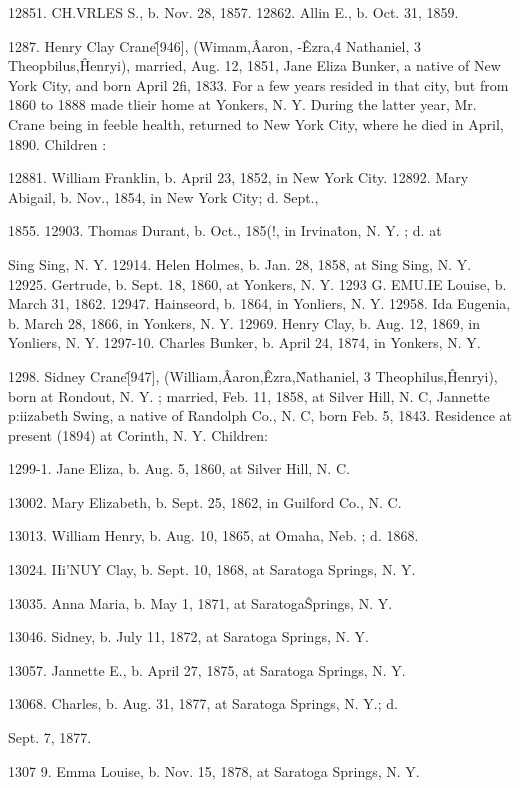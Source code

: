 \documentclass{book}
\begin{document}
12851. CH.VRLES S., b. Nov. 28, 1857. 
12862. Allin E., b. Oct. 31, 1859. 




1287. Henry Clay Crane\^ [946], (Wimam,\^ Aaron, -\^ Ezra,4 
Nathaniel, 3 Theopbilus,\^ Henryi), married, Aug. 12, 1851, Jane 
Eliza Bunker, a native of New York City, and born April 2fi, 
1833. For a few years resided in that city, but from 1860 to 
1888 made tlieir home at Yonkers, N. Y. During the latter year, 
Mr. Crane being in feeble health, returned to New York City, 
where he died in April, 1890. Children : 

12881. William Franklin, b. April 23, 1852, in New York City. 
12892. Mary Abigail, b. Nov., 1854, in New York City; d. Sept., 

1855. 
12903. Thomas Durant, b. Oct., 185(!, in Irvina\^ton, N. Y. ; d. at 

Sing Sing, N. Y. 
12914. Helen Holmes, b. Jan. 28, 1858, at Sing Sing, N. Y. 
12925. Gertrude, b. Sept. 18, 1860, at Yonkers, N. Y. 
1293 G. EMU.IE Louise, b. March 31, 1862. 
12947. Hainseord, b. 1864, in Yonliers, N. Y. 
12958. Ida Eugenia, b. March 28, 1866, in Yonkers, N. Y. 
12969. Henry Clay, b. Aug. 12, 1869, in Yonliers, N. Y. 
1297-10. Charles Bunker, b. April 24, 1874, in Yonkers, N. Y. 

1298. Sidney Crane\^ [947], (William,\^ Aaron,\^ Ezra,\^ 
Nathaniel, 3 Theophilus,\^ Henryi), born at Rondout, N. Y. ; 
married, Feb. 11, 1858, at Silver Hill, N. C, Jannette p:iizabeth 
Swing, a native of Randolph Co., N. C, born Feb. 5, 1843. 
Residence at present (1894) at Corinth, N. Y. Children: 

1299-1. Jane Eliza, b. Aug. 5, 1860, at Silver Hill, N. C. 

13002. Mary Elizabeth, b. Sept. 25, 1862, in Guilford Co., N. C. 

13013. William Henry, b. Aug. 10, 1865, at Omaha, Neb. ; d. 1868. 

13024. IIi'NUY Clay, b. Sept. 10, 1868, at Saratoga Springs, N. Y. 

13035. Anna Maria, b. May 1, 1871, at Saratoga\^Springs, N. Y. 

13046. Sidney, b. July 11, 1872, at Saratoga Springs, N. Y. 

13057. Jannette E., b. April 27, 1875, at Saratoga Springs, N. Y. 

13068. Charles, b. Aug. 31, 1877, at Saratoga Springs, N. Y.; d. 

Sept. 7, 1877. 

1307  9. Emma Louise, b. Nov. 15, 1878, at Saratoga Springs, N. Y. 
\end{document}

